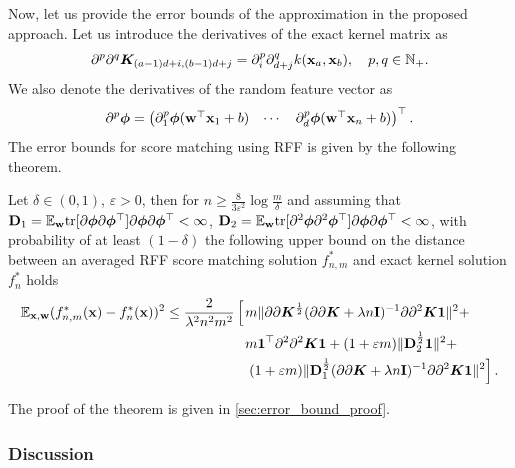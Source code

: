Now, let us provide the error bounds of the approximation in the proposed approach.
Let us introduce the derivatives of the exact kernel matrix as
\[
    \partial^p\partial^q {\bm K}_{(a - 1)d + i, (b - 1)d + j} = \partial^p_i\partial^q_{d + j}k({\bf x}_a, {\bf x}_b),
    \quad
    p, q \in \mathbb{N}_+.
\]
We also denote the derivatives of the random feature vector as
\[
   \partial^p\bm{\phi} = \begin{pmatrix}
        \partial_1^p\bm{\phi}({\bf w}^{\top}{\bf x}_1 + b) &
        \cdots &
        \partial^p_d\bm{\phi}({\bf w}^{\top}{\bf x}_n + b)
   \end{pmatrix}^\top.
\]
The error bounds for score matching using RFF is given by the following theorem.
\begin{theorem}
    Let $\delta \in (0, 1)$, $\varepsilon > 0$, then for
    $n \geq \frac{8}{3\varepsilon^2} \log\frac{m}{\delta}$ and assuming that
    ${\bf D}_1 = \mathbb{E}_{\bf w}{\rm tr}[\partial\bm{\phi}\partial\bm{\phi}^{\top}]
    \partial\bm{\phi}\partial\bm{\phi}^{\top} < \infty$, ${\bf D}_2 =
    \mathbb{E}_{\bf w}{\rm tr}[\partial^2\bm{\phi}\partial^2\bm{\phi}^{\top}]\partial\bm{\phi}
    \partial\bm{\phi}^{\top} < \infty$,
    with probability of at least $(1 - \delta)$ the following upper bound
    on the distance between an averaged RFF score matching solution $f_{n, m}^*$
    and exact kernel solution $f_n^*$ holds
    \begin{align*}
        \mathbb{E}_{{\bf x}, {\bf w}}(f_{n, m}^*({\bf x}) - f_n^*({\bf x}))^2 \leq
        \frac{2}{\lambda^2 n^2 m^2}\left[
            \vphantom{\partial\partial {\bm K}^{\frac{1}{2}}} \right .
            & m\|\partial\partial {\bm K}^{\frac{1}{2}}(\partial\partial {\bm K} + \lambda n{\bf I})^{-1}\partial\partial^2 {\bm K}{\bf 1}\|^2 +\nonumber \\
            &m{\bf 1}^{\top}\partial^2\partial^2{\bm K}{\bf 1} +
            (1 + \varepsilon m)\|{\bf D}_2^{\frac{1}{2}}{\bf 1}\|^2 + \nonumber \\
            &\left . (1 + \varepsilon m)\|{\bf D}_1^{\frac{1}{2}}(\partial\partial {\bm K} + \lambda n {\bf I})^{-1}\partial\partial^2 {\bm K}{\bf 1}\|^2
        \right ].
    \end{align*}
\end{theorem}
The proof of the theorem is given in \ref{sec:error_bound_proof}.

\subsubsection{Discussion}


